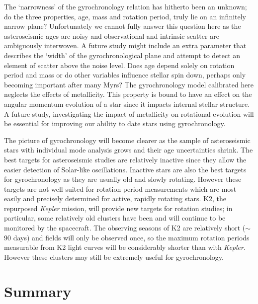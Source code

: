 \documentclass[useAMS, usenatbib]{mn2e}
\begin{document}
The `narrowness' of the gyrochronology relation has hitherto been an unknown;
do the three properties, age, mass and rotation period, truly lie on an
infinitely narrow plane?
Unfortunately we cannot fully answer this question here as the asteroseismic
ages are noisy and observational and intrinsic scatter are ambiguously
interwoven.
A future study might include an extra parameter that describes the `width' of
the gyrochronological plane and attempt to detect an element of scatter above
the noise level.
Does age depend solely on rotation period and mass or do other variables
influence stellar spin down, perhaps only becoming important after many Myrs?
The gyrochronology model calibrated here neglects the effects of metallicity.
This property is bound to have an effect on the angular momentum evolution
of a star since it impacts internal stellar structure.
A future study, investigating the impact of metallicity on rotational evolution
will be essential for improving our ability to date stars using gyrochronology.

The picture of gyrochronology will become clearer as the sample of
asteroseismic stars with individual mode analysis grows and their age
uncertainties shrink.
The best targets for asteroseismic studies are relatively inactive since they
allow the easier detection of Solar-like oscillations.
Inactive stars are also the best targets for gyrochronology as they are
usually old and slowly rotating.
However these targets are not well suited for
rotation period measurements which are most easily and precisely determined
for active, rapidly rotating stars.
K2, the repurposed {\it Kepler} mission, will provide new targets for rotation
studies; in particular, some relatively old clusters have been and will
continue to be monitored by the spacecraft.
The observing seasons of K2 are relatively short ($\sim$ 90 days) and fields
will only be observed once, so the maximum rotation periods measurable from
K2 light curves will be considerably shorter than with {\it Kepler}.
However these clusters may still be extremely useful for gyrochronology.

\section{Summary}
\label{sec:conclusions}
\end{document}
